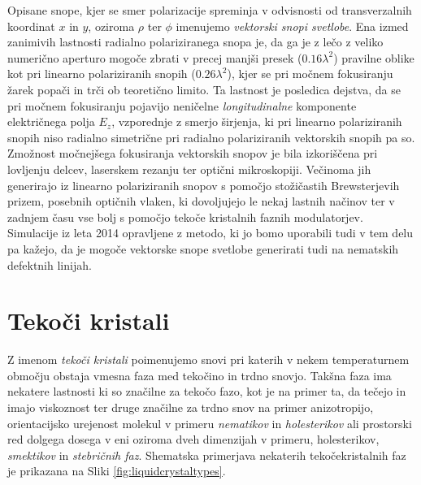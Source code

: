 \documentclass[longbibliography,slovene,a4paper,12pt]{book}
\begin{document}
Opisane snope, kjer se smer polarizacije spreminja v odvisnosti od transverzalnih koordinat $x$ in $y$, oziroma $\rho$ ter $\phi$ imenujemo \emph{vektorski snopi svetlobe}. Ena izmed zanimivih lastnosti radialno polariziranega snopa je, da ga je z lečo z veliko numerično aperturo mogoče zbrati v precej manjši presek ($0.16\lambda^2$) pravilne oblike kot pri linearno polariziranih snopih ($0.26\lambda^2$), kjer se pri močnem fokusiranju žarek popači in trči ob teoretično limito. Ta lastnost je posledica dejstva, da se pri močnem fokusiranju pojavijo neničelne \emph{longitudinalne} komponente električnega polja $E_z$, vzporednje z smerjo širjenja, ki pri linearno polariziranih snopih niso radialno simetrične pri radialno polariziranih vektorskih snopih pa so\cite{dorn}.\\

Zmožnost močnejšega fokusiranja vektorskih snopov je bila izkoriščena pri lovljenju delcev\cite{dorn}, laserskem rezanju\cite{niziev} ter optični mikroskopiji\cite{youngworth}. Večinoma jih generirajo iz linearno polariziranih snopov s pomočjo stožičastih Brewsterjevih prizem\cite{kozawa}, posebnih optičnih vlaken, ki dovoljujejo le nekaj lastnih načinov\cite{volpe} ter v zadnjem času vse bolj s pomočjo tekoče kristalnih faznih modulatorjev\cite{ko}. Simulacije iz leta 2014 opravljene z metodo, ki jo bomo uporabili tudi v tem delu pa kažejo, da je mogoče vektorske snope svetlobe generirati tudi na nematskih defektnih linijah\cite{cancula2}.



\section{Tekoči kristali}

Z imenom \emph{tekoči kristali} poimenujemo snovi pri katerih v nekem temperaturnem območju obstaja vmesna faza med tekočino in trdno snovjo. Takšna faza ima nekatere lastnosti ki so značilne za tekočo fazo, kot je na primer ta, da tečejo in imajo viskoznost ter druge značilne za trdno snov na primer anizotropijo, orientacijsko urejenost molekul v primeru \emph{nematikov} in \emph{holesterikov} ali prostorski red dolgega dosega v eni oziroma dveh dimenzijah v primeru, holesterikov, \emph{smektikov} in \emph{stebričnih faz}. Shematska primerjava nekaterih tekočekristalnih faz je prikazana na Sliki \ref{fig:liquidcrystaltypes}.\\
\end{document}
